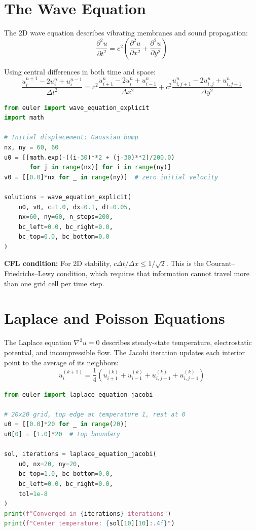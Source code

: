 \section{The Wave Equation}

The 2D wave equation describes vibrating membranes and sound propagation:
\[
\frac{\partial^2 u}{\partial t^2} = c^2 \left( \frac{\partial^2 u}{\partial x^2} + \frac{\partial^2 u}{\partial y^2} \right)
\]

Using central differences in both time and space:
\[
\frac{u_i^{n+1} - 2u_i^n + u_i^{n-1}}{\Delta t^2} = c^2 \frac{u_{i+1}^n - 2u_i^n + u_{i-1}^n}{\Delta x^2} + c^2 \frac{u_{i,j+1}^n - 2u_{i,j}^n + u_{i,j-1}^n}{\Delta y^2}
\]

\begin{lstlisting}[language=Python, caption=Wave equation solver]
from euler import wave_equation_explicit
import math

# Initial displacement: Gaussian bump
nx, ny = 60, 60
u0 = [[math.exp(-((i-30)**2 + (j-30)**2)/200.0)
       for j in range(nx)] for i in range(ny)]
v0 = [[0.0]*nx for _ in range(ny)]  # zero initial velocity

solutions = wave_equation_explicit(
    u0, v0, c=1.0, dx=0.1, dt=0.05,
    nx=60, ny=60, n_steps=200,
    bc_left=0.0, bc_right=0.0,
    bc_top=0.0, bc_bottom=0.0
)
\end{lstlisting}

\textbf{CFL condition:} For 2D stability, $c \Delta t / \Delta x \leq 1/\sqrt{2}$.
This is the Courant--Friedrichs--Lewy condition, which requires that information
cannot travel more than one grid cell per time step.

\section{Laplace and Poisson Equations}

The Laplace equation $\nabla^2 u = 0$ describes steady-state temperature, electrostatic
potential, and incompressible flow. The Jacobi iteration updates each interior point to
the average of its neighbors:
\[
u_i^{(k+1)} = \frac{1}{4} \left( u_{i+1}^{(k)} + u_{i-1}^{(k)} + u_{i,j+1}^{(k)} + u_{i,j-1}^{(k)} \right)
\]

\begin{lstlisting}[language=Python, caption=Laplace equation solver]
from euler import laplace_equation_jacobi

# 20x20 grid, top edge at temperature 1, rest at 0
u0 = [[0.0]*20 for _ in range(20)]
u0[0] = [1.0]*20  # top boundary

sol, iterations = laplace_equation_jacobi(
    u0, nx=20, ny=20,
    bc_top=1.0, bc_bottom=0.0,
    bc_left=0.0, bc_right=0.0,
    tol=1e-8
)
print(f"Converged in {iterations} iterations")
print(f"Center temperature: {sol[10][10]:.4f}")
\end{lstlisting}

